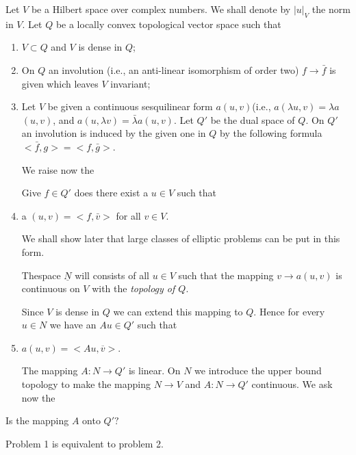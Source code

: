Let $V$ be a Hilbert space over complex numbers. We shall denote by
$|u|_V$ the norm in $V$. Let $Q$ be a locally convex topological
vector space such that  
\begin{enumerate}[1)]
\item $V \subset Q$ and $V$ is dense in $Q$;
\item On $Q$ an involution (i.e., an anti-linear isomorphism of order
  two)  $f \rightarrow \bar{f}$ is given which leaves $V$ invariant; 
\item Let $V$ be given a continuous sesquilinear form $a (u,v)$(i.e.,
  $a (\lambda u, v) = \lambda a$ $(u,v)$, and $a(u, \lambda v) =
  \bar{\lambda} a (u, v)$. Let $Q'$ be the dual space of $Q$. On
  $Q'$ an involution is induced by the given one in $Q$ by
  the following formula $ < \bar{f}, g > = < f, \bar{g}>$. 

  We raise now the 
  \begin{problem}\label{lec5:sec3:subsec1:prob3.1}%
    Give $f \in Q'$ does there exist a $u \in V$ such that
  \end{problem}
\item a $(u, v)= < f , \bar{v}>$  for all $v \in V$.
  
  We shall show later that large classes of elliptic problems can be put
  in this form. 
  \begin{definition}\label{lec5:sec3:subsec1:def3.1}  %
    The\pageoriginale space  $\underline{N}$ will consists of all $u \in V$ such
    that the mapping $v \rightarrow a (u, v)$ is continuous on $V$ with
    the {\em topology of $Q$}. 
    
    Since $V$ is dense in $Q$ we can extend this mapping to $Q$. Hence for
    every $u \in N$ we have an $Au \in Q'$ such that 
  \end{definition}
\item \quad $a(u, v) = <Au, \overline{v}>$.

  The mapping $A : N \rightarrow Q'$ is linear. On $N$ we introduce the
  upper bound topology to make the mapping $N \rightarrow V$ and $A : N
  \rightarrow Q'$ continuous. We ask now the 
\end{enumerate}

\begin{problem}\label{lec5:sec3:subsec1:prob3.2}%
  Is the mapping $A$ onto $Q'?$
\end{problem}

\begin{lemma}\label{lec5:sec3:subsec1:lem3.1}%
  Problem 1 is equivalent to problem 2.
\end{lemma}

